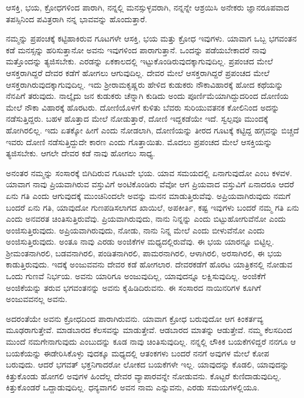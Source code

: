 {\small ಆಸಕ್ತಿ, ಭಯ, ಕ್ರೋಧಗಳಿಂದ ಪಾರಾಗಿ, ನನ್ನಲ್ಲಿ ಮನಸ್ಸುಳ್ಳವರಾಗಿ, ನನ್ನನ್ನೇ ಆಶ್ರಯಿಸಿ ಅನೇಕರು ಜ್ಞಾನರೂಪವಾದ ತಪಸ್ಸಿನಿಂದ ಪವಿತ್ರರಾಗಿ ನನ್ನ ಭಾವವನ್ನು ಹೊಂದುತ್ತಾರೆ.}

ನಮ್ಮನ್ನು ಪ್ರಪಂಚಕ್ಕೆ ಕಟ್ಟಿಹಾಕಿರುವ ಗೂಟಗಳೇ ಆಸಕ್ತಿ, ಭಯ ಮತ್ತು ಕ್ರೋಧ ಇವುಗಳು. ಯಾವಾಗ ಒಬ್ಬ ಭಗವಂತನ ಕಡೆ ಮನಸ್ಸನ್ನು ಹರಿಸುತ್ತಾನೋ ಅವನು ಇವುಗಳಿಂದ ಪಾರಾಗುತ್ತಾನೆ. ಒಂದನ್ನು ಪಡೆಯಬೇಕಾದರೆ ನಾವು ಮತ್ತೊಂದನ್ನು ತ್ಯಜಿಸಬೇಕು. ಎರಡನ್ನು ಏಕಕಾಲದಲ್ಲಿ ಇಟ್ಟುಕೊಂಡಿರುವುದಕ್ಕಾಗುವುದಿಲ್ಲ. ಪ್ರಪಂಚದ ಮೇಲೆ ಆಸಕ್ತರಾಗಿದ್ದರೆ ದೇವರ ಕಡೆಗೆ ಹೋಗಲು ಆಗುವುದಿಲ್ಲ. ದೇವರ ಮೇಲೆ ಆಸಕ್ತರಾಗಿದ್ದರೆ ಪ್ರಪಂಚದ ಮೇಲೆ ಆಸಕ್ತರಾಗಿರುವುದಕ್ಕಾಗುವುದಿಲ್ಲ. ಇದು ಶ‍್ರೀರಾಮಕೃಷ್ಣರು ಹೇಳಿದ ಕುಡುಕರು ನೌಕಾವಿಹಾರಕ್ಕೆ ಹೋದ ಕಥೆಯನ್ನು ನೆನಪಿಗೆ ತರುವುದು. ನಾಲ್ಕೈದು ಜನ ಕುಡುಕರು ಚೆನ್ನಾಗಿ ಕುಡಿದು ಅಂದು ಪೂರ್ಣಿಮೆಯಾಗಿದ್ದುದರಿಂದ ದೋಣಿಯ ಮೇಲೆ ನೌಕಾ ವಿಹಾರಕ್ಕೆ ಹೊರಟರು. ದೋಣಿಯೊಳಗೆ ಕುಳಿತು ಬೆವರು ಸುರಿಯುವತನಕ ಕೋಲಿನಿಂದ ಅದನ್ನು ನಡೆಸುತ್ತಿದ್ದರು. ಬಹಳ ಹೊತ್ತಾದ ಮೇಲೆ ನೋಡುತ್ತಾರೆ, ದೋಣಿ ಇದ್ದಕಡೆಯೇ ಇದೆ. ಸ್ವಲ್ಪವೂ ಮುಂದಕ್ಕೆ ಹೋಗಿರಲಿಲ್ಲ. ಇದು ಏತಕ್ಕೋ ಹೀಗೆ ಎಂದು ನೋಡಲಾಗಿ, ದೋಣಿಯನ್ನು ತೀರದ ಗೂಟಕ್ಕೆ ಕಟ್ಟಿದ್ದ ಹಗ್ಗವನ್ನು ಬಿಚ್ಚದೆ ಇವರು ದೋಣಿ ನಡೆಸುತ್ತಿದ್ದುದೇ ಕಾರಣ ಎಂದು ಗೊತ್ತಾಯಿತು. ಮೊದಲು ಪ್ರಪಂಚದ ಮೇಲೆ ಆಸಕ್ತಿಯನ್ನು ತ್ಯಜಿಸಬೇಕು. ಆಗಲೇ ದೇವರ ಕಡೆ ನಾವು ಹೋಗಲು ಸಾಧ್ಯ.

ಅನಂತರ ನಮ್ಮನ್ನು ಸಂಸಾರಕ್ಕೆ ಬಿಗಿದಿರುವ ಗೂಟವೇ ಭಯ. ಯಾವ ಸಮಯದಲ್ಲಿ ಏನಾಗುವುದೋ ಎಂಬ ಕಳವಳ. ಯಾವಾಗ ನಾವು ಪ್ರಿಯವಾಗಿರುವ ವಸ್ತುವಿಗೆ ಅಂಟಿಕೊಂಡಿರು ವೆವೋ ಆಗ ಪ್ರಿಯವಾದ ವಸ್ತುವಿಗೆ ಏನಾದರೂ ಆದರೆ ಏನು ಗತಿ ಎಂದು ಆಗುವುದಕ್ಕೆ ಮುಂಚಿನಿಂದಲೇ ಅವನ್ನು ಮನನ ಮಾಡುತ್ತಿರುವೆವು. ಅಪ್ರಿಯವಾಗಿರುವುದು ನಮಗೆ ಬಂದರೆ ಏನು ಗತಿ, ಯಾವುದೋ ಗುಣಪಡಿಸಲಾಗದ ಖಾಯಿಲೆ, ಅಪಕೀರ್ತಿ, ಕಷ್ಟ ಇವುಗಳು ಬಂದರೆ ನಮ್ಮ ಗತಿ ಏನು ಎಂದು ಅನವರತ ಚಿಂತಿಸುತ್ತಿರುವೆವು. ಪ್ರಿಯವಾಗಿರುವುದು, ನಾನು ನಿನ್ನನ್ನು ಎಂದು ಬಿಟ್ಟುಹೋಗುವೆನೋ ಎಂದು ಅಂಜಿಸುತ್ತಿರುವುದು. ಅಪ್ರಿಯವಾಗಿರುವುದು, ನೋಡು, ನಾನು ನಿನ್ನ ಮೇಲೆ ಎಂದು ಬೀಳುವೆನೋ ಎಂದು ಅಂಜಿಸುತ್ತಿರುವುದು. ಅಂತೂ ನಾವು ಎರಡು ಅಂಜಿಕೆಗಳ ಮಧ್ಯದಲ್ಲಿರುವೆವು. ಈ ಭಯ ಯಾರನ್ನೂ ಬಿಟ್ಟಿಲ್ಲ. ಶ‍್ರೀಮಂತನಾಗಿರಲಿ, ಬಡವನಾಗಿರಲಿ, ಪಂಡಿತನಾಗಿರಲಿ, ಪಾಮರನಾಗಿರಲಿ, ಆಳಾಗಿರಲಿ, ಅರಸಾಗಿರಲಿ, ಈ ಭಯ ಕಾಡುತ್ತಿರುವುದು. ಇದಕ್ಕೆ ಅಂಜುವವನು ದೇವರ ಕಡೆ ಹೋಗಲಾರ. ದೇವರಕಡೆಗೆ ಹೊರಟ ಯಾತ್ರಿಕನಲ್ಲಿ ನೋಡುವ ಒಂದು ಗುಣವೆ ನಿರ್ಭಯ. ಅವನು ಯಾರಿಗೂ ಅಂಜುವುದಿಲ್ಲ, ಯಾವುದನ್ನೂ ಲಕ್ಷಿಸುವುದಿಲ್ಲ. ಅಂಜಿಕೆಗೆ ಅಂಜಿಕೆಯನ್ನು ತರುವ ಭಗವಂತನನ್ನು ಅವನು ಕೈಹಿಡಿದಿರುವನು. ಈ ಸಂಸಾರದ ನಾಯಿನರಿಗಳ ಕೂಗಿಗೆ ಅಂಜುವವನಲ್ಲ ಅವನು.

ಅದರಂತೆಯೇ ಅವನು ಕ್ರೋಧದಿಂದ ಪಾರಾಗಿರುವನು. ಯಾವಾಗ ಕ್ರೋಧ ಬರುವುದೋ ಆಗ ಕಿಂಕರ್ತವ್ಯ ಮೂಢರಾಗುತ್ತೇವೆ. ಮಾಡಬಾರದ ಕೆಲಸವನ್ನು ಮಾಡುತ್ತೇವೆ. ಆಡಬಾರದ ಮಾತನ್ನು ಆಡುತ್ತೇವೆ. ನಮ್ಮ ಕೆಲಸದಿಂದ ಮುಂದೆ ನಮಗೇನಾಗುವುದು ಎಂಬುದನ್ನು ಕೂಡ ನಾವು ಚಿಂತಿಸುವುದಿಲ್ಲ. ನನ್ನಲ್ಲಿ ಲೌಕಿಕ ಬಯಕೆಗಳಿದ್ದರೆ ನನಗೂ ಆ ಬಯಕೆಯನ್ನು ಈಡೇರಿಸಿಕೊಳ್ಳು ವುದಕ್ಕೂ ಮಧ್ಯದಲ್ಲಿ ಆತಂಕಗಳು ಬಂದರೆ ನನಗೆ ಅವುಗಳ ಮೇಲೆ ಕೋಪ ಬರುವುದು. ಆದರೆ ಭಗವತ್ ಭಕ್ತನಿಗಾದರೋ ಲೋಕದ ಬಯಕೆಗಳೇ ಇಲ್ಲ. ಯಾವುದನ್ನು ಕೊಡಲಿ, ಯಾವುದನ್ನು ಕಿತ್ತುಕೊಂಡು ಹೋಗಲಿ ಅವುಗಳ ಹಿಂದೆಲ್ಲ ದೇವರ ವ್ಯಾಪಾರವನ್ನೇ ನೋಡುವನು. ಕೊಟ್ಟರೆ ಕುಣಿದಾಡುವುದಿಲ್ಲ. ಕಿತ್ತುಕೊಂಡರೆ ಒದ್ದಾಡುವುದಿಲ್ಲ. ಧನ್ಯವಾಗಲಿ ಅವನ ನಾಮ ಎನ್ನುವನು, ಎರಡು ಸಮಯಗಳಲ್ಲಿಯೂ.

